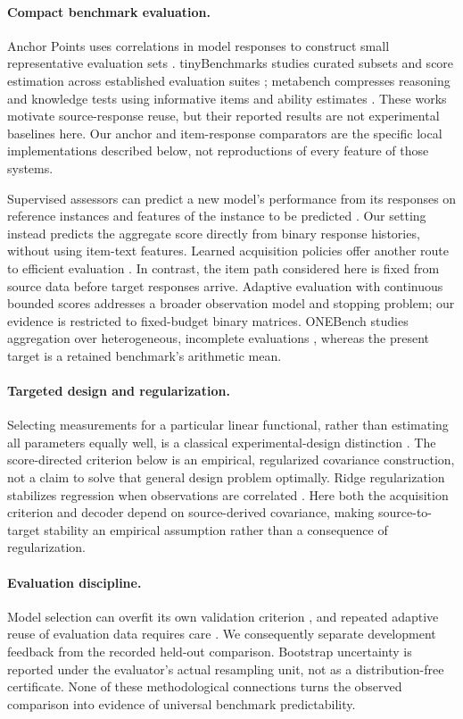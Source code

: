 \documentclass{article}
\begin{document}
\paragraph{Compact benchmark evaluation.}
Anchor Points uses correlations in model responses to construct small representative evaluation sets \citep{Vivek2024}. tinyBenchmarks studies curated subsets and score estimation across established evaluation suites \citep{Polo2024}; metabench compresses reasoning and knowledge tests using informative items and ability estimates \citep{Kipnis2025}. These works motivate source-response reuse, but their reported results are not experimental baselines here. Our anchor and item-response comparators are the specific local implementations described below, not reproductions of every feature of those systems.

Supervised assessors can predict a new model's performance from its responses on reference instances and features of the instance to be predicted \citep{Pacchiardi2024}. Our setting instead predicts the aggregate score directly from binary response histories, without using item-text features. Learned acquisition policies offer another route to efficient evaluation \citep{Li2025}. In contrast, the item path considered here is fixed from source data before target responses arrive. Adaptive evaluation with continuous bounded scores \citep{Balkir2026} addresses a broader observation model and stopping problem; our evidence is restricted to fixed-budget binary matrices. ONEBench studies aggregation over heterogeneous, incomplete evaluations \citep{Ghosh2024}, whereas the present target is a retained benchmark's arithmetic mean.

\paragraph{Targeted design and regularization.}
Selecting measurements for a particular linear functional, rather than estimating all parameters equally well, is a classical experimental-design distinction \citep{Elfving1952}. The score-directed criterion below is an empirical, regularized covariance construction, not a claim to solve that general design problem optimally. Ridge regularization stabilizes regression when observations are correlated \citep{Hoerl1970}. Here both the acquisition criterion and decoder depend on source-derived covariance, making source-to-target stability an empirical assumption rather than a consequence of regularization.

\paragraph{Evaluation discipline.}
Model selection can overfit its own validation criterion \citep{Cawley2010}, and repeated adaptive reuse of evaluation data requires care \citep{Dwork2015}. We consequently separate development feedback from the recorded held-out comparison. Bootstrap uncertainty \citep{Efron1979} is reported under the evaluator's actual resampling unit, not as a distribution-free certificate. None of these methodological connections turns the observed comparison into evidence of universal benchmark predictability.
\end{document}
